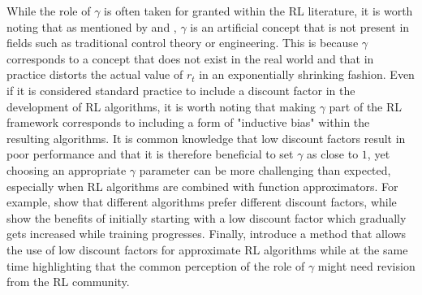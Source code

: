 While the role of $\gamma$ is often taken for granted within the RL literature, it is worth noting that as mentioned by \citet{hessel2019inductive} and \citet{schmidhuber2019reinforcement}, $\gamma$ is an artificial concept that is not present in fields such as traditional control theory or engineering. This is because $\gamma$ corresponds to a concept that does not exist in the real world and that in practice distorts the actual value of $r_t$ in an exponentially shrinking fashion. Even if it is considered standard practice to include a discount factor in the development of RL algorithms, it is worth noting that making $\gamma$ part of the RL framework corresponds to including a form of "inductive bias" within the resulting algorithms. It is common knowledge that low discount factors result in poor performance and that it is therefore beneficial to set $\gamma$ as close to $1$, yet choosing an appropriate $\gamma$ parameter can be more challenging than expected, especially when RL algorithms are combined with function approximators. For example, \citet{wiering2009qv} show that different algorithms prefer different discount factors, while \citet{franccois2015discount} show the benefits of initially starting with a low discount factor which gradually gets increased while training progresses. Finally, \citet{vanseijen2019using} introduce a method that allows the use of low discount factors for approximate RL algorithms while at the same time highlighting that the common perception of the role of $\gamma$ might need revision from the RL community.             

